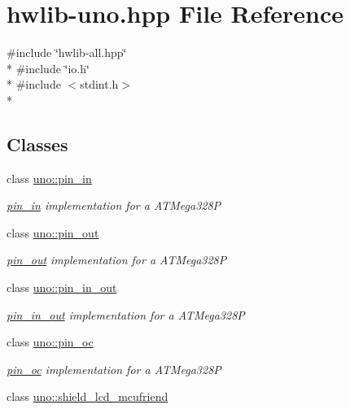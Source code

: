 \hypertarget{hwlib-uno_8hpp}{}\section{hwlib-\/uno.hpp File Reference}
\label{hwlib-uno_8hpp}
{\ttfamily \#include \char`\"{}hwlib-\/all.\+hpp\char`\"{}}\\*
{\ttfamily \#include \char`\"{}io.\+h\char`\"{}}\\*
{\ttfamily \#include $<$stdint.\+h$>$}\\*
\subsection*{Classes}
\begin{DoxyCompactItemize}
\item 
class \hyperlink{classuno_1_1pin__in}{uno\+::pin\+\_\+in}
\begin{DoxyCompactList}\small\item\em \hyperlink{classuno_1_1pin__in}{pin\+\_\+in} implementation for a A\+T\+Mega328P \end{DoxyCompactList}\item 
class \hyperlink{classuno_1_1pin__out}{uno\+::pin\+\_\+out}
\begin{DoxyCompactList}\small\item\em \hyperlink{classuno_1_1pin__out}{pin\+\_\+out} implementation for a A\+T\+Mega328P \end{DoxyCompactList}\item 
class \hyperlink{classuno_1_1pin__in__out}{uno\+::pin\+\_\+in\+\_\+out}
\begin{DoxyCompactList}\small\item\em \hyperlink{classuno_1_1pin__in__out}{pin\+\_\+in\+\_\+out} implementation for a A\+T\+Mega328P \end{DoxyCompactList}\item 
class \hyperlink{classuno_1_1pin__oc}{uno\+::pin\+\_\+oc}
\begin{DoxyCompactList}\small\item\em \hyperlink{classuno_1_1pin__oc}{pin\+\_\+oc} implementation for a A\+T\+Mega328P \end{DoxyCompactList}\item 
class \hyperlink{classuno_1_1shield__lcd__mcufriend}{uno\+::shield\+\_\+lcd\+\_\+mcufriend}
\end{DoxyCompactItemize}
